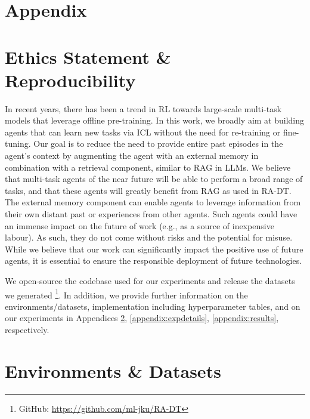 \section*{Appendix}
\renewcommand{\baselinestretch}{0.75}\normalsize
\tableofcontents

\section{Ethics Statement \& Reproducibility}\label{appendix:impact}
In recent years, there has been a trend in RL towards large-scale multi-task models that leverage offline pre-training.  
In this work, we broadly aim at building agents that can learn new tasks via ICL without the need for re-training or fine-tuning.
Our goal is to reduce the need to provide entire past episodes in the agent's context by augmenting the agent with an external memory in combination with a retrieval component, similar to RAG in LLMs. 
We believe that multi-task agents of the near future will be able to perform a broad range of tasks, and that these agents will greatly benefit from RAG as used in RA-DT. 
The external memory component can enable agents to leverage information from their own distant past or experiences from other agents. 
Such agents could have an immense impact on the future of work (e.g., as a source of inexpensive labour).  
As such, they do not come without risks and the potential for misuse.  
While we believe that our work can significantly impact the positive use of future agents, it is essential to ensure the responsible deployment of future technologies.

We open-source the codebase used for our experiments and release the datasets we generated \footnote{GitHub: \url{https://github.com/ml-jku/RA-DT}}. 
In addition, we provide further information on the environments/datasets, implementation including hyperparameter tables, and on our experiments in Appendices \ref{appendix:env-data}, \ref{appendix:expdetails}, \ref{appendix:results}, respectively. 



\section{Environments \& Datasets}\label{appendix:env-data}
